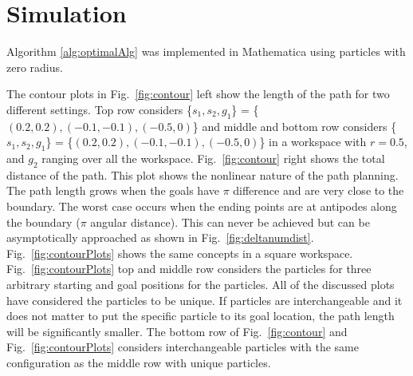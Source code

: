 
\section{Simulation}\label{sec:simulation}




Algorithm \ref{alg:optimalAlg}  was implemented in Mathematica using particles with zero radius. 
 
 The contour plots in Fig.~\ref{fig:contour} left show the length of the path for two different settings. Top row considers \{$s_1,s_2,g_1$\} = \{$(0.2,0.2),(-0.1,-0.1),(-0.5,0)$\} and middle and bottom row considers  \{$s_1,s_2,g_1$\} = \{$(0.2,0.2),(-0.1,-0.1),(-0.5,0)$\} in a workspace with $r= 0.5$, and $g_2$ ranging over all the workspace. Fig.~\ref{fig:contour} right shows the total distance of the path. This plot shows the nonlinear nature of the path planning. The path length grows when the goals have $\pi$ difference and are very close to the boundary. 
 The worst case occurs when the ending points are at antipodes along the boundary ($\pi$ angular distance). This can never be achieved but can be asymptotically approached as shown in Fig.~\ref{fig:deltanumdist}. 
 Fig.~\ref{fig:contourPlots} shows the same concepts in a square workspace. Fig.~\ref{fig:contourPlots} top and middle row considers the particles for three arbitrary starting and goal positions for the particles. All of the discussed plots have considered the particles to be unique. If particles are interchangeable and it does not matter to put the specific particle to its goal location, the path length will be significantly smaller. The bottom row of Fig.~\ref{fig:contour} and Fig.~\ref{fig:contourPlots} considers interchangeable particles with the same configuration as the middle row with unique particles.
 
